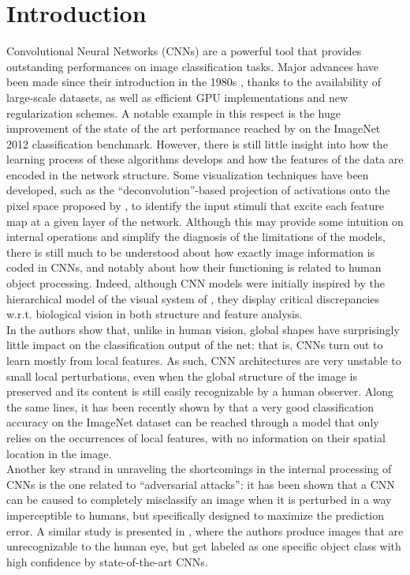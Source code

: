 \documentclass[11pt,oneside,reqno]{amsart}
\begin{document}
 
 
 \section{Introduction}
 
  Convolutional Neural Networks (CNNs) are a powerful tool that provides outstanding performances on image classification tasks. Major advances have been made since their introduction in the 1980s \citep{fuku}, thanks to the availability of large-scale datasets, as well as efficient GPU implementations and new regularization schemes. A notable example in this respect is the huge improvement of the state of the art performance reached by \citet{krizhevsky} on the ImageNet 2012 classification benchmark. However, there is still little insight into how the learning process of these algorithms develops and how the features of the data are encoded in the network structure. Some visualization techniques have been developed, such as the ``deconvolution''-based projection of activations onto the pixel space proposed by \citet{zeiler}, to identify the input stimuli that excite each feature map at a given layer of the network. Although this may provide some intuition on internal operations and simplify the diagnosis of the limitations of the models, there is still much to be understood about how exactly image information is coded in CNNs, and notably about how their functioning is related to human object processing. Indeed, although CNN models were initially inspired \citep{fuku,lecun_cnns} by the hierarchical model of the visual system of \citet{HW}, they display critical discrepancies w.r.t. biological vision in both structure and feature analysis.\\
  In \citet{baker} the authors show that, unlike in human vision, global shapes have surprisingly little impact on the classification output of the net: that is, CNNs turn out to learn mostly from local features. As such, CNN architectures are very unstable to small local perturbations, even when the global structure of the image is preserved and its content is still easily recognizable by a human observer. Along the same lines, it has been recently shown by \citet{brendel} that a very good classification accuracy on the ImageNet dataset can be reached through a model that only relies on the occurrences of local features, with no information on their spatial location in the image.\\
  Another key strand in unraveling the shortcomings in the internal processing of CNNs is the one related to ``adversarial attacks'': it has been shown \citep{szegedy} that a CNN can be caused to completely misclassify an image when it is perturbed in a way imperceptible to humans, but specifically designed to maximize the prediction error. A similar study is presented in \citet{fooled}, where the authors produce images that are unrecognizable to the human eye, but get labeled as one specific object class with high confidence by state-of-the-art CNNs.\\
\end{document}
